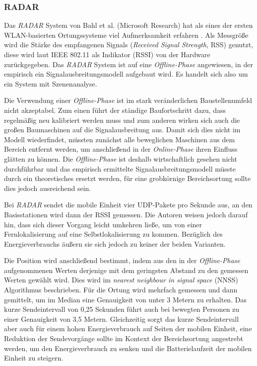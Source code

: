 \subsubsection{RADAR}
\label{ch:Vorherige:sec:RADAR}
Das \emph{RADAR} System von Bahl et al. (Microsoft Research) hat als eines der ersten WLAN-basierten Ortungssysteme viel Aufmerksamkeit erfahren \cite{bahl2000radar}.
Als Messgröße wird die Stärke des empfangenen Signals (\emph{Received Signal Strength}, RSS) genutzt, diese wird laut IEEE 802.11 als Indikator (RSSI) von der Hardware zurückgegeben. 
Das \emph{RADAR} System ist auf eine \emph{Offline-Phase} angewiesen, in der empirisch ein Signalausbreitungsmodell aufgebaut wird. 
Es handelt sich also um ein System mit Szenenanalyse.

Die Verwendung einer \emph{Offline-Phase} ist im stark veränderlichen Baustellenumfeld nicht akzeptabel. 
Zum einen führt der ständige Baufortschritt dazu, dass regelmäßig neu kalibriert werden muss und zum anderen wirken sich auch die großen Baumaschinen auf die Signalausbreitung aus. 
Damit sich dies nicht im Modell wiederfindet, müssten zunächst alle beweglichen Maschinen aus dem Bereich entfernt werden, um anschließend in der \emph{Online-Phase} ihren Einfluss glätten zu können.
Die \emph{Offline-Phase} ist deshalb wirtschaftlich gesehen nicht durchführbar und das empirisch ermittelte Signalausbreitungsmodell müsste durch ein theoretisches ersetzt werden, für eine grobkörnige Bereichsortung sollte dies jedoch ausreichend sein.

Bei \emph{RADAR} sendet die mobile Einheit vier UDP-Pakete pro Sekunde aus, an den Basisstationen wird dann der RSSI gemessen.
Die Autoren weisen jedoch darauf hin, dass sich dieser Vorgang leicht umkehren ließe, um von einer Fernlokalisierung auf eine Selbstlokalisierung zu kommen.
Bezüglich des Energieverbrauchs äußern sie sich jedoch zu keiner der beiden Varianten.

Die Position wird anschließend bestimmt, indem aus den in der \emph{Offline-Phase} aufgenommenen Werten derjenige mit dem geringsten Abstand zu den gemessen Werten gewählt wird. 
Dies wird im \emph{nearest neighbour in signal space} (NNSS) Algorithmus beschrieben.
Für die Ortung wird mehrfach gemessen und dann gemittelt, um im Median eine Genauigkeit von unter 3 Metern zu erhalten. 
Das kurze Sendeintervall von 0,25 Sekunden führt auch bei bewegten Personen zu einer Genauigkeit von 3,5 Metern.
Gleichzeitig sorgt das kurze Sendeintervall aber auch für einem hohen Energieverbrauch auf Seiten der mobilen Einheit, eine Reduktion der Sendevorgänge sollte im Kontext der Bereichsortung angestrebt werden, um den Energieverbrauch zu senken und die Batterielaufzeit der mobilen Einheit zu steigern.

